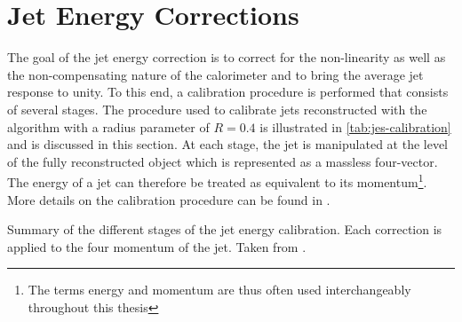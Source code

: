 \section{Jet Energy Corrections}
\label{sec:jes-calibration}
The goal of the jet energy correction is to correct for the non-linearity as well as the non-compensating nature of the calorimeter and to bring the average jet response to unity.
To this end, a calibration procedure is performed that consists of several stages. The procedure used to calibrate jets reconstructed with the \antikt algorithm with a radius parameter of $R = 0.4$ is illustrated in \cref{tab:jes-calibration} and is discussed in this section. At each stage, the jet is manipulated at the level of the fully reconstructed object which is represented as a massless four-vector. The energy of a jet can therefore be treated as equivalent to its momentum\footnote{The terms energy and momentum are thus often used interchangeably throughout this thesis}. More details on the calibration procedure can be found in .

\begin{table}
    \caption[Summary of the different stages of the jet energy calibration.]{Summary of the different stages of the jet energy calibration. Each correction is applied to the four momentum of the jet. Taken from .}
    \label{tab:jes-calibration}
\end{table}

